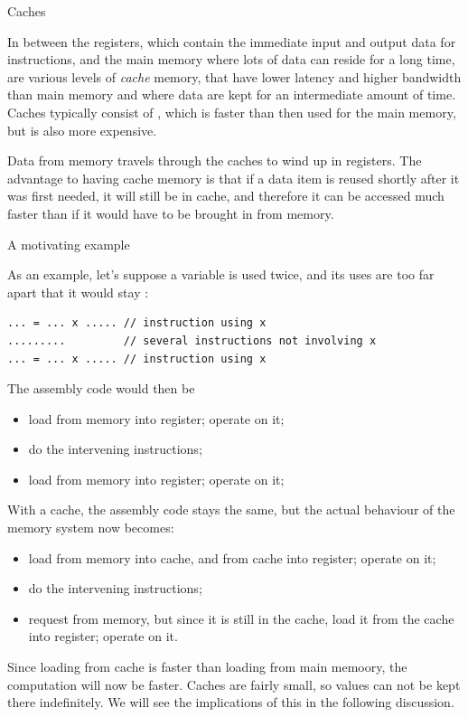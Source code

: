 
 {Caches}
\label{sec:cache}

In between the registers, which contain the immediate input and output
data for instructions, and the main memory where lots of data can reside for a
long time, are various levels of \emph{cache} memory, that have
lower latency and higher bandwidth than main memory and where data are
kept for an intermediate amount of time.  Caches typically
consist of , which is faster than then 
used for the main memory, but is also more expensive.

Data from
memory travels through the caches to wind up in registers. The
advantage to having cache memory is that if a data item is reused
shortly after it was first needed, it will still be in cache, and
therefore it can be accessed much faster than if it would have to be
brought in from memory.

 {A motivating example}

As an example, let's suppose a variable  is used twice, and its
uses are too far apart that it would stay :
\begin{verbatim}
... = ... x ..... // instruction using x
.........         // several instructions not involving x
... = ... x ..... // instruction using x
\end{verbatim}
The assembly code would then be
\begin{itemize}
\item load  from memory into register; operate on it;
\item do the intervening instructions;
\item load  from memory into register; operate on it;
\end{itemize}
With a cache, the assembly code stays the same, but the actual
behaviour of the memory system now becomes:
\begin{itemize}
\item load  from memory into cache, and from cache into register;
  operate on it;
\item do the intervening instructions;
\item request  from memory, but since it is still in the cache,
  load it from the cache into register; operate on it.
\end{itemize}
Since loading from cache is faster than loading from main memoory, the
computation will now be faster. Caches are fairly small, so values
can not be kept there indefinitely. We will see the implications of
this in the following discussion.

